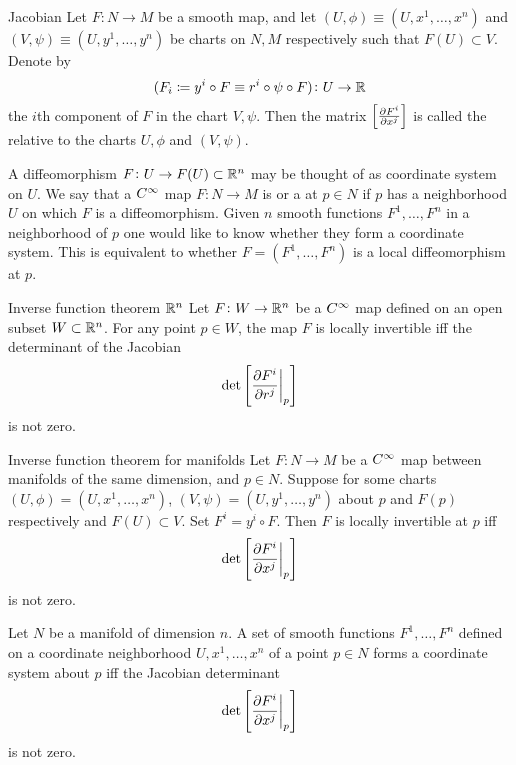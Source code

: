 \begin{definition}{Jacobian}{}
    Let \(F \colon N \rightarrow M\) be a smooth map, and let \((U, \phi) \equiv (U, x^1, \dots, x^n)\) and \((V, \psi) \equiv (U, y^1, \dots, y^n)\) be charts on \(N, M\) respectively such that \(F(U) \subset V\).
    Denote by
    \[
        (F_i \coloneqq y^i \circ F \equiv r^i \circ \psi \circ F) \colon U \rightarrow \mathbb{R}
    \]
    the \(i\)th component of \(F\) in the chart \(V, \psi\).
    Then the matrix \(\left[ \pdv{F^i}{x^j} \right]\) is called the  relative to the charts \(U, \phi\) and \((V, \psi)\).
\end{definition}

A diffeomorphism \(F \colon U \rightarrow F(U) \subset \mathbb{R}^n\) may be thought of as coordinate system on \(U\).
We say that a \(C^\infty\) map \(F \colon N \rightarrow M\) is  or a  at \(p \in N\) if \(p\) has a neighborhood \(U\) on which \(F\) is a diffeomorphism.
Given \(n\) smooth functions \(F^1, \dots, F^n\) in a neighborhood of \(p\) one would like to know whether they form a coordinate system.
This is equivalent to whether \(F = (F^1, \dots, F^n)\) is a local diffeomorphism at \(p\).
\begin{theorem}{Inverse function theorem \(\mathbb{R}^n\)}{}
    Let \(F \colon W \rightarrow \mathbb{R}^n\) be a \(C^\infty\) map defined on an open subset \(W \subset \mathbb{R}^n\).
    For any point \(p \in W\), the map \(F\) is locally invertible iff the determinant of the Jacobian \[\det \left[ \evalat[\bigg]{\pdv{F^i}{r^j}}{p}   \right]\] is not zero.
\end{theorem}
\begin{theorem}{Inverse function theorem for manifolds}{}
    Let \(F \colon N \rightarrow M\) be a \(C^\infty\) map between manifolds of the same dimension, and \(p \in N\).
    Suppose for some charts \((U, \phi) = (U, x^1, \dots, x^n)\), \((V, \psi) = (U, y^1, \dots, y^n)\) about \(p\) and \(F(p)\) respectively and \(F(U) \subset V\).
    Set \(F^i = y^i \circ F\).
    Then \(F\) is locally invertible at \(p\) iff
    \[\det \left[ \evalat[\bigg]{\pdv{F^i}{x^j}}{p}   \right]\]
    is not zero.
\end{theorem}
\begin{corollary}{}{}
    Let \(N\) be a manifold of dimension \(n\). A set of smooth functions \(F^1, \dots, F^n\) defined on a coordinate neighborhood \(U, x^1, \dots, x^n\) of a point \(p \in N\) forms a coordinate system about \(p\) iff the Jacobian determinant
    \[\det \left[ \evalat[\bigg]{\pdv{F^i}{x^j}}{p}   \right]\]
    is not zero.
\end{corollary}

